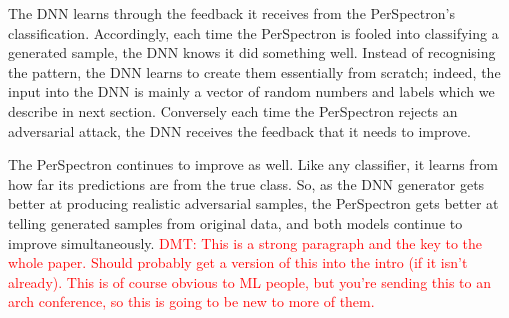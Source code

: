 The DNN learns through the feedback it receives from the PerSpectron's classification. 
 Accordingly, each time the PerSpectron is fooled into classifying a generated sample, the DNN knows it did something well. Instead of recognising the pattern, the DNN learns to create them essentially from scratch; indeed, the input into the DNN is mainly a vector of random numbers and labels which we describe in next section.  Conversely each time the PerSpectron  rejects an adversarial attack, the DNN receives the feedback that it needs to improve.

The PerSpectron continues to improve as well. Like any classifier, it learns from how far its predictions are from the true class. 
So, as the DNN generator gets better at producing realistic adversarial samples, the PerSpectron gets better at telling generated samples from original data, and both models continue to improve simultaneously. 
\textcolor{red}{DMT: This is a strong paragraph and the key to the whole paper.  Should probably get
a version of this into the intro (if it isn't already).  This is of course obvious to ML people, but you're sending this
to an arch conference, so this is going to be new to more of them.}






 




